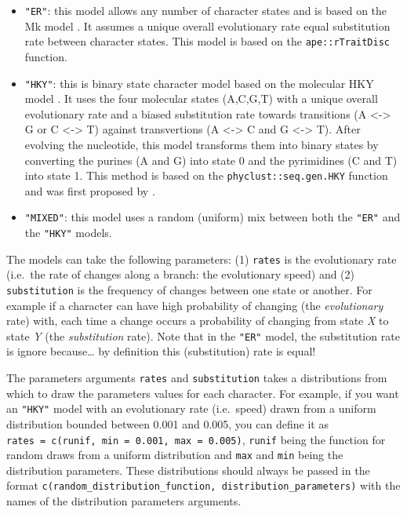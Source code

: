 \documentclass[
]{book}
\providecommand{\tightlist}{%
  \setlength{\itemsep}{0pt}\setlength{\parskip}{0pt}}
\begin{document}
\begin{itemize}
\tightlist
\item
  \texttt{"ER"}: this model allows any number of character states and is based on the Mk model \citep{lewisa2001}. It assumes a unique overall evolutionary rate equal substitution rate between character states. This model is based on the \texttt{ape::rTraitDisc} function.
\item
  \texttt{"HKY"}: this is binary state character model based on the molecular HKY model \citep{HKY85}. It uses the four molecular states (A,C,G,T) with a unique overall evolutionary rate and a biased substitution rate towards transitions (A \textless-\textgreater{} G or C \textless-\textgreater{} T) against transvertions (A \textless-\textgreater{} C and G \textless-\textgreater{} T). After evolving the nucleotide, this model transforms them into binary states by converting the purines (A and G) into state 0 and the pyrimidines (C and T) into state 1. This method is based on the \texttt{phyclust::seq.gen.HKY} function and was first proposed by \citet{OReilly2016}.
\item
  \texttt{"MIXED"}: this model uses a random (uniform) mix between both the \texttt{"ER"} and the \texttt{"HKY"} models.
\end{itemize}

The models can take the following parameters:
(1) \texttt{rates} is the evolutionary rate (i.e.~the rate of changes along a branch: the evolutionary speed) and (2) \texttt{substitution} is the frequency of changes between one state or another.
For example if a character can have high probability of changing (the \emph{evolutionary} rate) with, each time a change occurs a probability of changing from state \emph{X} to state \emph{Y} (the \emph{substitution} rate).
Note that in the \texttt{"ER"} model, the substitution rate is ignore because\ldots{} by definition this (substitution) rate is equal!

The parameters arguments \texttt{rates} and \texttt{substitution} takes a distributions from which to draw the parameters values for each character.
For example, if you want an \texttt{"HKY"} model with an evolutionary rate (i.e.~speed) drawn from a uniform distribution bounded between 0.001 and 0.005, you can define it as \texttt{rates\ =\ c(runif,\ min\ =\ 0.001,\ max\ =\ 0.005)}, \texttt{runif} being the function for random draws from a uniform distribution and \texttt{max} and \texttt{min} being the distribution parameters.
These distributions should always be passed in the format \texttt{c(random\_distribution\_function,\ distribution\_parameters)} with the names of the distribution parameters arguments.
\end{document}
